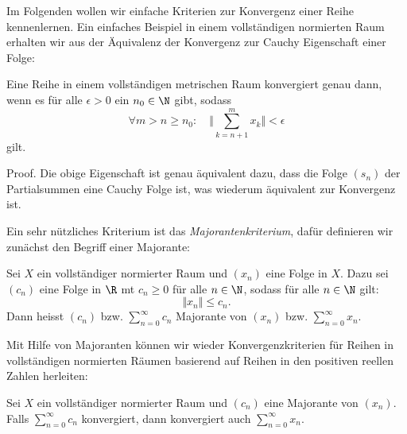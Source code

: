 \documentclass[letterpaper,10pt,english]{jupyterBook}
\begin{document}
Im Folgenden wollen wir einfache Kriterien zur Konvergenz einer Reihe kennenlernen. Ein einfaches Beispiel in einem vollständigen normierten Raum erhalten wir aus der Äquivalenz der Konvergenz zur Cauchy Eigenschaft einer Folge:
\label{metrik/reihen:theorem-3}
\begin{theorem}{}{}



Eine Reihe in einem vollständigen metrischen Raum konvergiert genau dann, wenn es für alle \(\epsilon > 0\) ein \(n_0 \in \N\) gibt, sodass
\begin{equation*}
 \forall m > n \geq n_0: \quad \Vert \sum_{k=n+1}^m x_k \Vert < \epsilon
\end{equation*}
gilt.
\end{theorem}

\begin{emphBox}{}{}
Proof.  Die obige Eigenschaft ist genau äquivalent dazu, dass die Folge \((s_n)\) der Partialsummen eine Cauchy Folge ist, was wiederum äquivalent zur Konvergenz ist.
\end{emphBox}

Ein sehr nützliches Kriterium ist das \emph{Majorantenkriterium}, dafür definieren wir zunächst den Begriff einer Majorante:
\label{metrik/reihen:definition-4}
\begin{definition}{}{}



Sei \(X\) ein vollständiger normierter Raum und \((x_n)\) eine Folge in \(X\). Dazu sei \((c_n)\) eine Folge in \(\R\) mt \(c_n \geq 0\) für alle \(n \in \N\), sodass für alle \(n \in \N\) gilt:
\begin{equation*}
 \Vert x_n \Vert \leq c_n .
\end{equation*}
Dann heisst \((c_n)\) bzw. \(\sum_{n=0}^\infty c_n\) Majorante von \((x_n)\) bzw. \(\sum_{n=0}^\infty x_n\).
\end{definition}

Mit Hilfe von Majoranten können wir wieder Konvergenzkriterien für Reihen in vollständigen normierten Räumen basierend auf Reihen in den positiven reellen Zahlen herleiten:
\label{metrik/reihen:theorem-5}
\begin{theorem}{}{}



Sei \(X\) ein vollständiger normierter Raum und \((c_n)\) eine Majorante von \((x_n)\). Falls \(\sum_{n=0}^\infty c_n\) konvergiert, dann konvergiert auch \(\sum_{n=0}^\infty x_n\).
\end{theorem}
\end{document}
